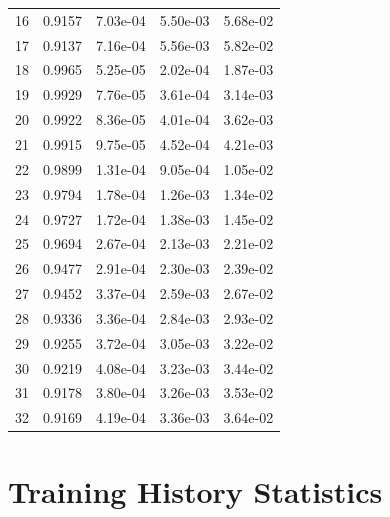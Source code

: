 \documentclass[12pt,a4paper]{report}
\begin{document}
\begin{longtable}{ccccc}
16 & 0.9157 & 7.03e-04 & 5.50e-03 & 5.68e-02 \\
17 & 0.9137 & 7.16e-04 & 5.56e-03 & 5.82e-02 \\
18 & 0.9965 & 5.25e-05 & 2.02e-04 & 1.87e-03 \\
19 & 0.9929 & 7.76e-05 & 3.61e-04 & 3.14e-03 \\
20 & 0.9922 & 8.36e-05 & 4.01e-04 & 3.62e-03 \\
21 & 0.9915 & 9.75e-05 & 4.52e-04 & 4.21e-03 \\
22 & 0.9899 & 1.31e-04 & 9.05e-04 & 1.05e-02 \\
23 & 0.9794 & 1.78e-04 & 1.26e-03 & 1.34e-02 \\
24 & 0.9727 & 1.72e-04 & 1.38e-03 & 1.45e-02 \\
25 & 0.9694 & 2.67e-04 & 2.13e-03 & 2.21e-02 \\
26 & 0.9477 & 2.91e-04 & 2.30e-03 & 2.39e-02 \\
27 & 0.9452 & 3.37e-04 & 2.59e-03 & 2.67e-02 \\
28 & 0.9336 & 3.36e-04 & 2.84e-03 & 2.93e-02 \\
29 & 0.9255 & 3.72e-04 & 3.05e-03 & 3.22e-02 \\
30 & 0.9219 & 4.08e-04 & 3.23e-03 & 3.44e-02 \\
31 & 0.9178 & 3.80e-04 & 3.26e-03 & 3.53e-02 \\
32 & 0.9169 & 4.19e-04 & 3.36e-03 & 3.64e-02 \\
\end{longtable}

\section{Training History Statistics}
\end{document}
